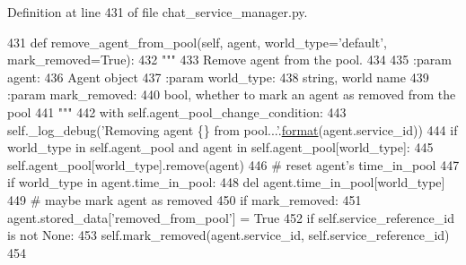 Definition at line 431 of file chat\+\_\+service\+\_\+manager.\+py.


\begin{DoxyCode}
431     \textcolor{keyword}{def }remove\_agent\_from\_pool(self, agent, world\_type='default', mark\_removed=True):
432         \textcolor{stringliteral}{"""}
433 \textcolor{stringliteral}{        Remove agent from the pool.}
434 \textcolor{stringliteral}{}
435 \textcolor{stringliteral}{        :param agent:}
436 \textcolor{stringliteral}{            Agent object}
437 \textcolor{stringliteral}{        :param world\_type:}
438 \textcolor{stringliteral}{            string, world name}
439 \textcolor{stringliteral}{        :param mark\_removed:}
440 \textcolor{stringliteral}{            bool, whether to mark an agent as removed from the pool}
441 \textcolor{stringliteral}{        """}
442         with self.agent\_pool\_change\_condition:
443             self.\_log\_debug(\textcolor{stringliteral}{'Removing agent \{\} from pool...'}.\hyperlink{namespaceparlai_1_1chat__service_1_1services_1_1messenger_1_1shared__utils_a32e2e2022b824fbaf80c747160b52a76}{format}(agent.service\_id))
444             \textcolor{keywordflow}{if} world\_type \textcolor{keywordflow}{in} self.agent\_pool \textcolor{keywordflow}{and} agent \textcolor{keywordflow}{in} self.agent\_pool[world\_type]:
445                 self.agent\_pool[world\_type].remove(agent)
446                 \textcolor{comment}{# reset agent's time\_in\_pool}
447                 \textcolor{keywordflow}{if} world\_type \textcolor{keywordflow}{in} agent.time\_in\_pool:
448                     del agent.time\_in\_pool[world\_type]
449                 \textcolor{comment}{# maybe mark agent as removed}
450                 \textcolor{keywordflow}{if} mark\_removed:
451                     agent.stored\_data[\textcolor{stringliteral}{'removed\_from\_pool'}] = \textcolor{keyword}{True}
452                     \textcolor{keywordflow}{if} self.service\_reference\_id \textcolor{keywordflow}{is} \textcolor{keywordflow}{not} \textcolor{keywordtype}{None}:
453                         self.mark\_removed(agent.service\_id, self.service\_reference\_id)
454 
\end{DoxyCode}
\mbox{\label{classparlai_1_1chat__service_1_1core_1_1chat__service__manager_1_1ChatServiceManager_a49a2a816f16454f0acb26e178cb104c8}} 

